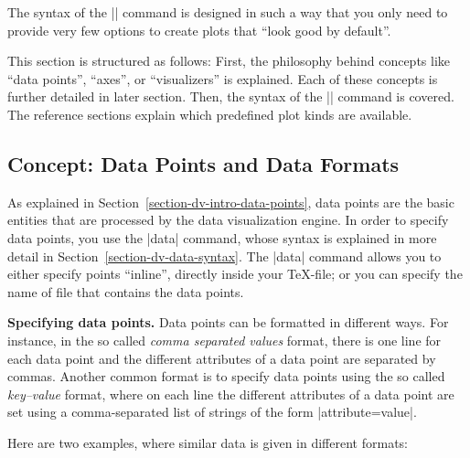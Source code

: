 The syntax of the |\datavisualization| command is designed in such a way that
you only need to provide very few options to create plots that ``look good by
default''.

This section is structured as follows: First, the philosophy behind concepts
like ``data points'', ``axes'', or ``visualizers'' is explained. Each of these
concepts is further detailed in later section. Then, the syntax of the
|\datavisualization| command is covered. The reference sections explain which
predefined plot kinds are available.


\subsection{Concept: Data Points and Data Formats}

As explained in Section~\ref{section-dv-intro-data-points}, data points are the
basic entities that are processed by the data visualization engine. In order to
specify data points, you use the |data| command, whose syntax is explained in
more detail in Section~\ref{section-dv-data-syntax}. The |data| command allows
you to either specify points ``inline'', directly inside your \TeX-file; or you
can specify the name of file that contains the data points.

\medskip
\textbf{Specifying data points.}
Data points can be formatted in different ways. For instance, in the so called
\emph{comma separated values} format, there is one line for each data point and
the different attributes of a data point are separated by commas. Another
common format is to specify data points using the so called \emph{key--value}
format, where on each line the different attributes of a data point are set
using a comma-separated list of strings of the form |attribute=value|.

Here are two examples, where similar data is given in different formats:
%
\begin{codeexample}[preamble={\usetikzlibrary{datavisualization}}]
\end{codeexample}

\begin{codeexample}[preamble={\usetikzlibrary{datavisualization.formats.functions}}]
\end{codeexample}

